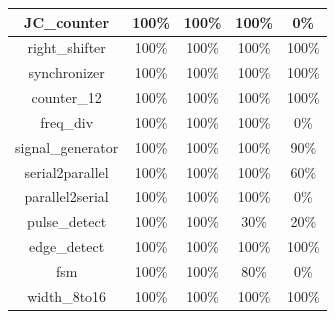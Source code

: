 \begin{tabular}{c|cc|cc}
JC\_counter & \color{black} {\cellcolor{lightblue}} 100\% & \color{black} {\cellcolor{lightgreen}} 100\% & \color{black} {\cellcolor{lightblue}} 100\% & 0\% \\ \midrule
right\_shifter & \color{black} {\cellcolor{lightblue}} 100\% & \color{black} {\cellcolor{lightgreen}} 100\% & \color{black} {\cellcolor{lightblue}} 100\% & \color{black} {\cellcolor{lightgreen}} 100\% \\ \midrule
synchronizer & \color{black} {\cellcolor{lightblue}} 100\% & \color{black} {\cellcolor{lightgreen}} 100\% & \color{black} {\cellcolor{lightblue}} 100\% & \color{black} {\cellcolor{lightgreen}} 100\% \\ \midrule
counter\_12 & \color{black} {\cellcolor{lightblue}} 100\% & \color{black} {\cellcolor{lightgreen}} 100\% & \color{black} {\cellcolor{lightblue}} 100\% & \color{black} {\cellcolor{lightgreen}} 100\% \\ \midrule
freq\_div & \color{black} {\cellcolor{lightblue}} 100\% & \color{black} {\cellcolor{lightgreen}} 100\% & \color{black} {\cellcolor{lightblue}} 100\% & 0\% \\ \midrule
signal\_generator & \color{black} {\cellcolor{lightblue}} 100\% & \color{black} {\cellcolor{lightgreen}} 100\% & \color{black} {\cellcolor{lightblue}} 100\% & 90\% \\ \midrule
serial2parallel & \color{black} {\cellcolor{lightblue}} 100\% & \color{black} {\cellcolor{lightgreen}} 100\% & \color{black} {\cellcolor{lightblue}} 100\% & 60\% \\ \midrule
parallel2serial & \color{black} {\cellcolor{lightblue}} 100\% & \color{black} {\cellcolor{lightgreen}} 100\% & \color{black} {\cellcolor{lightblue}} 100\% & 0\% \\ \midrule
pulse\_detect & \color{black} {\cellcolor{lightblue}} 100\% & \color{black} {\cellcolor{lightgreen}} 100\% & 30\% & 20\% \\ \midrule
edge\_detect & \color{black} {\cellcolor{lightblue}} 100\% & \color{black} {\cellcolor{lightgreen}} 100\% & \color{black} {\cellcolor{lightblue}} 100\% & \color{black} {\cellcolor{lightgreen}} 100\% \\ \midrule
fsm & \color{black} {\cellcolor{lightblue}} 100\% & \color{black} {\cellcolor{lightgreen}} 100\% & 80\% & 0\% \\ \midrule
width\_8to16 & \color{black} {\cellcolor{lightblue}} 100\% & \color{black} {\cellcolor{lightgreen}} 100\% & \color{black} {\cellcolor{lightblue}} 100\% & \color{black} {\cellcolor{lightgreen}} 100\% \\ \midrule

\end{tabular}
